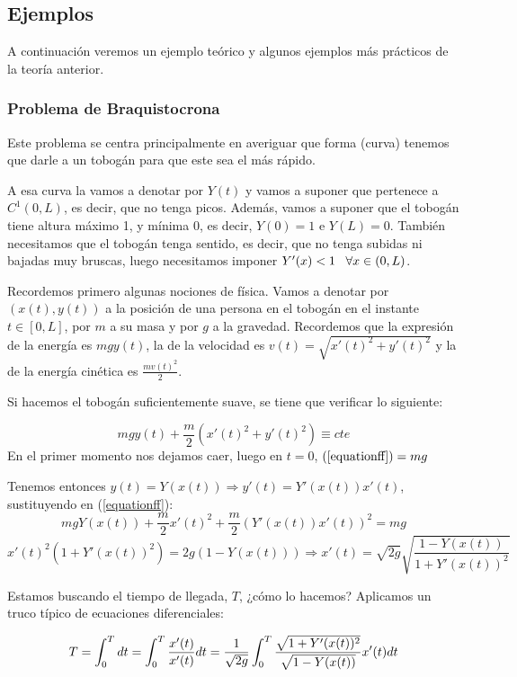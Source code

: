 \subsection{Ejemplos}

A continuación veremos un ejemplo teórico y algunos ejemplos más prácticos de la teoría anterior.

\subsubsection{Problema de Braquistocrona}

Este problema se centra principalmente en averiguar que forma (curva) tenemos que darle a un tobogán para que este sea el más rápido.

A esa curva la vamos a denotar por $Y(t)$ y vamos a suponer que  pertenece a $C^1(0,L)$, es decir, que no tenga picos. Además, vamos a suponer que el tobogán tiene altura máximo 1, y mínima 0, es decir, $Y(0)=1$ e $Y(L)=0$. También necesitamos que el tobogán tenga sentido, es decir, que no tenga subidas ni bajadas muy bruscas, luego necesitamos imponer $Y'(x)<1 \;\;\; \forall x \in (0,L)$.

Recordemos primero algunas nociones de física. Vamos a denotar por $(x(t),y(t))$ a la posición de una persona en el tobogán en el instante $t\in[0,L]$, por $m$ a su masa y por $g$ a la gravedad. Recordemos que la expresión de la energía es $mgy(t)$, la de la velocidad es $v(t)=\sqrt{x'(t)^2+y'(t)^2}$ y la de la energía cinética es $\frac{mv(t)^2}{2}$.

Si hacemos el tobogán suficientemente suave, se tiene que verificar lo siguiente:

\begin{equation}
\label{equationff}
mgy(t)+\frac{m}{2}(x'(t)^2+y'(t)^2)\equiv cte
\end{equation}
En el primer momento nos dejamos caer, luego en $t=0$, $(\ref{equationff})=mg$

Tenemos entonces $y(t)=Y(x(t)) \Rightarrow y'(t)=Y'(x(t))x'(t)$, sustituyendo en (\ref{equationff}):
\[
mgY(x(t))+\frac{m}{2}x'(t)^2+\frac{m}{2}(Y'(x(t))x'(t))^2=mg
\]
\[
x'(t)^2\left(1+Y'(x(t))^2\right)=2g\left(1-Y(x(t))\right)\Rightarrow x'(t)=\sqrt{2g}\sqrt{\frac{1-Y(x(t))}{1+Y'(x(t))^2}}
\]

Estamos buscando el tiempo de llegada, $T$, ¿cómo lo hacemos? Aplicamos un truco típico de ecuaciones diferenciales:

\[
T = \displaystyle\int_{ 0 }^{ T } dt=\displaystyle\int_{ 0 }^{ T } \frac{x'(t)}{x'(t)}dt=
\frac{1}{\sqrt{2g}}\displaystyle\int_{ 0 }^{ T } \frac{\sqrt{1+Y'(x(t))^2}}{\sqrt{1-Y(x(t))}}x'(t)dt
\]

